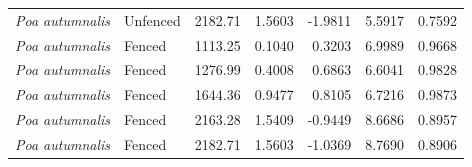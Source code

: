 \documentclass[12pt]{article}\usepackage[]{graphicx}\usepackage[dvipsnames]{xcolor}
\begin{document}
\begin{landscape}
\begin{table}[ht]
\begin{tabular}{llrrrrr}
\textit{Poa autumnalis}    & Unfenced & 2182.71 & 1.5603  & -1.9811 & 5.5917 & 0.7592 \\
\textit{Poa autumnalis}    & Fenced   & 1113.25 & 0.1040  & 0.3203  & 6.9989 & 0.9668 \\
\textit{Poa autumnalis}    & Fenced   & 1276.99 & 0.4008  & 0.6863  & 6.6041 & 0.9828 \\
\textit{Poa autumnalis}    & Fenced   & 1644.36 & 0.9477  & 0.8105  & 6.7216 & 0.9873 \\
\textit{Poa autumnalis}    & Fenced   & 2163.28 & 1.5409  & -0.9449 & 8.6686 & 0.8957 \\
\textit{Poa autumnalis}    & Fenced   & 2182.71 & 1.5603  & -1.0369 & 8.7690 & 0.8906 \\
\hline
\end{tabular}
\end{table}
\end{landscape}
\end{document}
